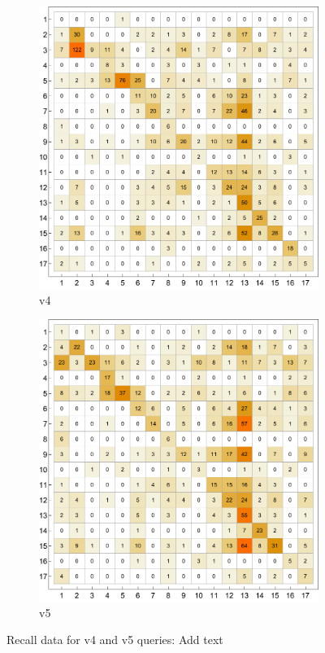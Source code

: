 \documentclass{article}
\begin{document}
\begin{figure}[H]
    \centering
         \begin{subfigure}{0.49\textwidth}
                     \centering
            \includegraphics[width=\textwidth]{figures/recallmatrixv4.pdf}
            \caption{v4}
            \label{subfig1}
        \end{subfigure}
             \hfill
         \begin{subfigure}{0.49\textwidth}
                     \centering
            \includegraphics[width=\textwidth]{figures/recallmatrixv5.pdf}
            \caption{v5}
            \label{subfig2}
        \end{subfigure}
        \caption{Recall data for v4 and v5 queries: Add text}
\end{figure}
\end{document}
